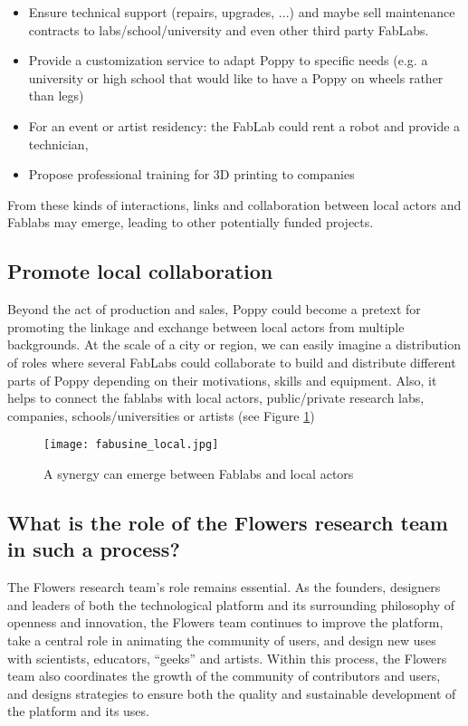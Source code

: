 \begin{itemize}
    \item Ensure technical support (repairs, upgrades, ...) and maybe sell maintenance contracts to labs/school/university and even other third party FabLabs.
    \item Provide a customization service to adapt Poppy to specific needs (e.g. a university or high school that would like to have a Poppy on wheels rather than legs)
    \item For an event or artist residency: the FabLab could rent a robot and provide a technician,
    \item Propose professional training for 3D printing to companies
\end{itemize}

From these kinds of interactions, links and collaboration between local actors and Fablabs may emerge, leading to other potentially funded projects.

\subsection{Promote local collaboration} %

Beyond the act of production and sales, Poppy could become a pretext for promoting the linkage and exchange between local actors from multiple backgrounds. At the scale of a city or region, we can easily imagine a distribution of roles where several FabLabs could collaborate to build and distribute different parts of Poppy depending on their motivations, skills and equipment.
Also, it helps to connect the fablabs with local actors, public/private research labs, companies, schools/universities or artists (see Figure \ref{fig:local_synergy})

\begin{figure}[tb]
    \begin{center}
        \texttt{[image: fabusine\_local.jpg]}
    \end{center}
    \caption{A synergy can emerge between Fablabs and local actors}
    \label{fig:local_synergy}
\end{figure}

\subsection{What is the role of the Flowers research team in such a process? } %

The Flowers research team's role remains essential. As the founders, designers and leaders of both the technological platform and its surrounding philosophy of openness and innovation, the Flowers team continues to improve the platform, take a central role in animating the community of users, and design new uses with scientists, educators, “geeks” and artists. Within this process, the Flowers team also coordinates the growth of the community of contributors and users, and designs strategies to ensure both the quality and sustainable development of the platform and its uses.

